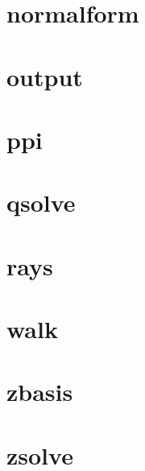 \clearpage
\section{normalform}

{\small
}

\clearpage
\section{output}
{\small
}

\clearpage
\section{ppi}
{\small
}

\clearpage
\section{qsolve}
{\small
}

\clearpage
\section{rays}
{\small
}

\clearpage
\section{walk}

{\small
}

\clearpage
\section{zbasis}

{\small
}

\clearpage
\section{zsolve}
{\small
}


